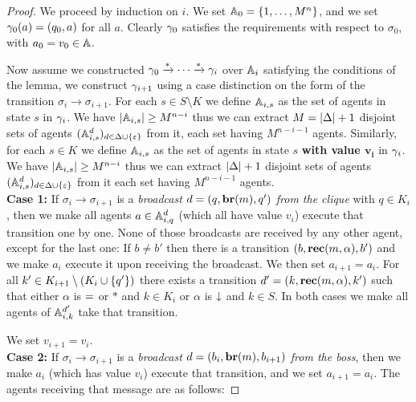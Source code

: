 \begin{proof}
	
	We proceed by induction on $i$.
	We set $\mathbb{A}_0 = \{1, \ldots, M^n\}$, and we set $\gamma_0(a) = (q_0, a)$ for all $a$. Clearly $\gamma_0$ satisfies the requirements with respect to $\sigma_0$, with $a_0 = v_0 \in \mathbb{A}$.
	
	Now assume we constructed $\gamma_0 \xrightarrow{*} \cdots \xrightarrow{*} \gamma_{i}$ over $\mathbb{A}_i$ satisfying the conditions of the lemma, we construct $\gamma_{i+1}$ using a case distinction on the form of the transition $\sigma_i \to \sigma_{i+1}$.
	For each $s \in S\setminus K$ we define $\mathbb{A}_{i,s}$ as the set of agents in state $s$ in $\gamma_{i}$. We have $|\mathbb{A}_{i,s}| \geq M^{n-i}$ thus we can extract $M = |\Delta|+1$ disjoint sets of agents $(\mathbb{A}_{i,s}^d)_{d \in \Delta\cup\{\varepsilon\}}$ from it, each set having $M^{n-i-1}$ agents.
	Similarly, for each $s \in K$ we define $\mathbb{A}_{i,s}$ as the set of agents in state $s$ \textbf{with value $\mathbf{v_i}$} in $\gamma_{i}$. We have $|\mathbb{A}_{i,s}| \geq M^{n-i}$ thus we can extract $|\Delta|+1$ disjoint sets of agents $(\mathbb{A}_{i,s}^d)_{d \in \Delta\cup\{\varepsilon\}}$ from it each set having $M^{n-i-1}$ agents.
	\\
	
	\textbf{Case 1: } If $\sigma_i \to \sigma_{i+1}$ is a \emph{broadcast $d = (q, \textbf{br}(m), q')$ from the clique} with $q \in K_i$, then we make all agents $a \in \mathbb{A}_{i,q}^{d}$ (which all have value $v_i$) execute that transition one by one.
	None of those broadcasts are received by any other agent, except for the last one:
	If $b \neq b'$ then there is a transition $(b, \textbf{rec}(m, \alpha), b')$ and we make $a_i$ execute it upon receiving the broadcast. We then set $a_{i+1} = a_i$.
	For all $k' \in K_{i+1} \setminus (K_i \cup \{q'\})$ there exists a transition $d'=(k, \textbf{rec}(m, \alpha), k')$ such that either $\alpha$ is ${=}$ or $*$ and $k \in K_i$ or $\alpha$ is $\downarrow$ and $k\in S$.
	In both cases we make all agents of $\mathbb{A}_{i,k}^{d'}$ take that transition.
	
	We set $v_{i+1} = v_i$.
	\\
	
	\textbf{Case 2: }If $\sigma_i \to \sigma_{i+1}$ is a \emph{broadcast $d = (b_i, \textbf{br}(m), b_{i+1})$ from the boss}, then we make $a_i$ (which has value $v_i$) execute that transition, and we set $a_{i+1} = a_i$.
	The agents receiving that message are as follows:
	

\end{proof}
